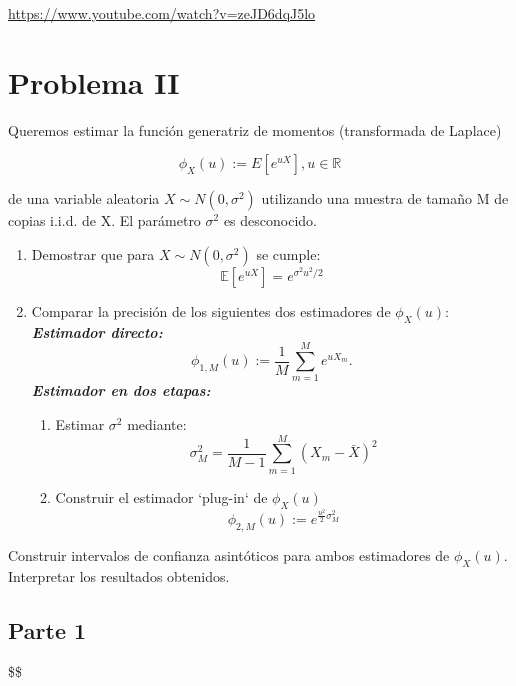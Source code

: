 \documentclass[
  letterpaper,
  DIV=11,
  numbers=noendperiod]{scrreprt}
\providecommand{\tightlist}{%
  \setlength{\itemsep}{0pt}\setlength{\parskip}{0pt}}\usepackage{longtable,booktabs,array}
\begin{document}
\url{https://www.youtube.com/watch?v=zeJD6dqJ5lo}


\chapter{Problema II}\label{problema-ii}

Queremos estimar la función generatriz de momentos (transformada de
Laplace)

\[
\phi_{X}(u):=E[e^{uX}], u \in \mathbb{R}
\]

de una variable aleatoria \(X\sim N(0,\sigma^{2})\) utilizando una
muestra de tamaño M de copias i.i.d. de X. El parámetro \(\sigma^{2}\)
es desconocido.

\begin{enumerate}
\def\labelenumi{\arabic{enumi}.}
\item
  Demostrar que para \(X\sim N(0,\sigma^{2})\) se cumple: \[
    \mathbb{E}[e^{uX}]=e^{\sigma^{2}u^{2}/2}
  \]
\item
  Comparar la precisión de los siguientes dos estimadores de
  \(\phi_{X}(u)\):\\
  \textbf{\emph{Estimador directo:}} \[
    \phi_{1,M}(u):=\frac{1}{M}\sum_{m=1}^{M}e^{uX_{m}}.
  \] \textbf{\emph{Estimador en dos etapas:}}

  \begin{enumerate}
  \def\labelenumii{\alph{enumii})}
  \tightlist
  \item
    Estimar \(\sigma^{2}\) mediante: \[
       \sigma_{M}^{2}=\frac{1}{M-1}\sum_{m=1}^{M}(X_{m}-\bar{X})^{2}
    \]
  \item
    Construir el estimador `plug-in` de \(\phi_{X}(u)\) \[
      \phi_{2,M}(u):=e^{\frac{u^{2}}{2}\sigma_{M}^{2}}
    \]
  \end{enumerate}
\end{enumerate}

Construir intervalos de confianza asintóticos para ambos estimadores de
\(\phi_{X}(u)\). Interpretar los resultados obtenidos.

\section{Parte 1}\label{parte-1}

\$\$
\end{document}
